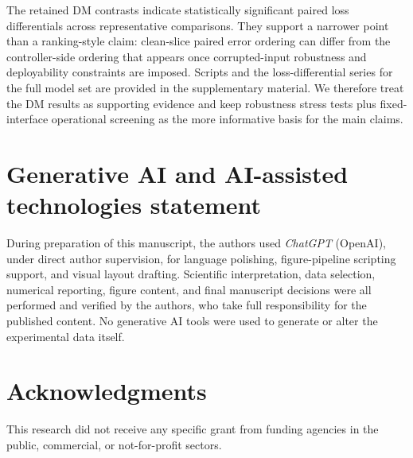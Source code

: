 \documentclass[review,1p,times]{elsarticle}
\begin{document}
The retained DM contrasts indicate statistically significant paired loss differentials across representative comparisons. They support a narrower point than a ranking-style claim: clean-slice paired error ordering can differ from the controller-side ordering that appears once corrupted-input robustness and deployability constraints are imposed. Scripts and the loss-differential series for the full model set are provided in the supplementary material. We therefore treat the DM results as supporting evidence and keep robustness stress tests plus fixed-interface operational screening as the more informative basis for the main claims.

\section*{Generative AI and AI-assisted technologies statement}
During preparation of this manuscript, the authors used \textit{ChatGPT} (OpenAI), under direct author supervision, for language polishing, figure-pipeline scripting support, and visual layout drafting. Scientific interpretation, data selection, numerical reporting, figure content, and final manuscript decisions were all performed and verified by the authors, who take full responsibility for the published content. No generative AI tools were used to generate or alter the experimental data itself.

\section*{Acknowledgments}
This research did not receive any specific grant from funding agencies in the public, commercial, or not-for-profit sectors.


\end{document}
